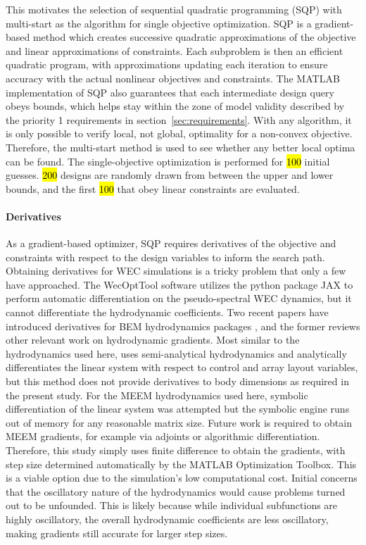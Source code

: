 This motivates the selection of sequential quadratic programming (SQP) with multi-start as the algorithm for single objective optimization.
SQP is a gradient-based method which creates successive quadratic approximations of the objective and linear approximations of constraints.
Each subproblem is then an efficient quadratic program, with approximations updating each iteration to ensure accuracy with the actual nonlinear objectives and constraints.
The MATLAB implementation of SQP also guarantees that each intermediate design query obeys bounds, which helps stay within the zone of model validity described by the priority 1 requirements in section~\ref{sec:requirements}.
With any algorithm, it is only possible to verify local, not global, optimality for a non-convex objective.
Therefore, the multi-start method is used to see whether any better local optima can be found.
The single-objective optimization is performed for \hl{100} initial guesses.
\hl{200} designs are randomly drawn from between the upper and lower bounds, and the first \hl{100} that obey linear constraints are evaluated. %

\paragraph{Derivatives}
As a gradient-based optimizer, SQP requires derivatives of the objective and constraints with respect to the design variables to inform the search path.
Obtaining derivatives for WEC simulations is a tricky problem that only a few have approached.
The WecOptTool software utilizes the python package JAX \cite{bradbury_jax_2018} to perform automatic differentiation on the pseudo-spectral WEC dynamics, but it cannot differentiate the hydrodynamic coefficients.
Two recent papers have introduced derivatives for BEM hydrodynamics packages \cite{rohrer_analytical_2024, khanal_fully_2025}, and the former reviews other relevant work on hydrodynamic gradients.
Most similar to the hydrodynamics used here, \cite{gambarini_gradient_2024} uses semi-analytical hydrodynamics and analytically differentiates the linear system with respect to control and array layout variables, but this method does not provide derivatives to body dimensions as required in the present study.
For the MEEM hydrodynamics used here, symbolic differentiation of the linear system was attempted but the symbolic engine runs out of memory for any reasonable matrix size.
Future work is required to obtain MEEM gradients, for example via adjoints or algorithmic differentiation.
Therefore, this study simply uses finite difference to obtain the gradients, with step size determined automatically by the MATLAB Optimization Toolbox.
This is a viable option due to the simulation's low computational cost.
Initial concerns that the oscillatory nature of the hydrodynamics would cause problems \cite{mccabe_open-source_2024} turned out to be unfounded.
This is likely because while individual subfunctions are highly oscillatory, the overall hydrodynamic coefficients are less oscillatory, making gradients still accurate for larger step sizes. 

